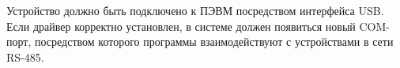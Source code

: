 Устройство должно быть подключено к ПЭВМ посредством интерфейса USB. Если драйвер корректно установлен, в системе должен появиться новый COM-порт, посредством которого программы взаимодействуют с устройствами в сети RS-485.
